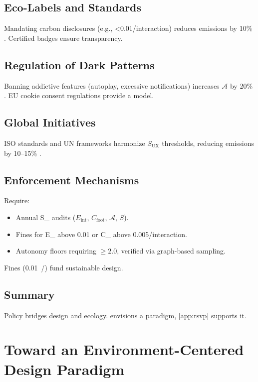 \documentclass[openany]{book}
\newcommand{\Sent}{S} %
\newcommand{\Eint}{E_{\mathrm{int}}} %
\newcommand{\Cfoot}{C_{\mathrm{foot}}} %
\newcommand{\Auton}{\mathcal{A}} %
\newcommand{\SUX}{S_{\mathrm{UX}}} %
\newcommand{\kWh}{\mathrm{kWh}}
\begin{document}
\section{Eco-Labels and Standards}
\label{sec:policy-labels}
Mandating carbon disclosures (e.g., \SI{<0.01}{\kgCOe}/interaction) reduces emissions by 10\% \citep{adobe2021,extentia2024}. Certified badges ensure transparency.

\section{Regulation of Dark Patterns}
\label{sec:policy-dark}
Banning addictive features (autoplay, excessive notifications) increases \(\Auton\) by 20\% \citep{colak2024,doctorow2022}. EU cookie consent regulations provide a model.

\section{Global Initiatives}
\label{sec:policy-global}
ISO standards and UN frameworks harmonize \(\SUX\) thresholds, reducing emissions by 10--15\% \citep{adobe2021,extentia2024}.

\section{Enforcement Mechanisms}
\label{sec:policy-enforce}
Require:
\begin{itemize}
  \item Annual \SUX{} audits (\(\Eint\), \(\Cfoot\), \(\Auton\), \(\Sent\)).
  \item Fines for \Eint{} above \SI{0.01}{\kWh} or \Cfoot{} above \SI{0.005}{\kgCOe}/interaction.
  \item Autonomy floors requiring \Auton{} \(\geq 2.0\), verified via graph-based sampling.
\end{itemize}
Fines (\SI{0.01}{\USD/\kWh}) fund sustainable design.

\section{Summary}
Policy bridges design and ecology.  envisions a paradigm, \cref{app:rsvp} supports it.

\chapter{Toward an Environment-Centered Design Paradigm}
\label{ch:paradigm}
\end{document}
